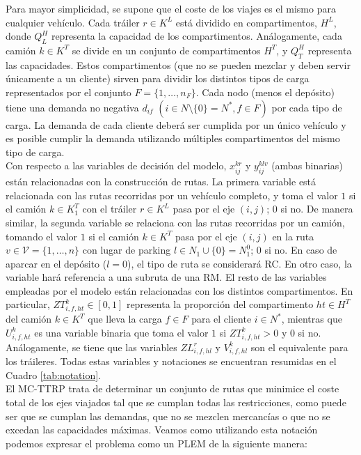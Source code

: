 Para mayor simplicidad, se supone que el coste de los viajes es el mismo para cualquier vehículo. Cada tráiler $r\in K^L$ está dividido en compartimentos, $H^L$, donde $Q_L^H$ representa la capacidad de los compartimentos. Análogamente, cada camión $k\in K^T$ se divide en un conjunto de compartimentos $H^T$, y $Q_T^H$ representa las capacidades. Estos compartimentos (que no se pueden mezclar y deben servir únicamente a un cliente) sirven para dividir los distintos tipos de carga representados por el conjunto $F=\{1,\ldots,n_F\}$. Cada nodo (menos el depósito) tiene una demanda no negativa $d_{if}$ $(i\in N\setminus\{0\}=N^*,f\in F)$ por cada tipo de carga. La demanda de cada cliente deberá ser cumplida por un único vehículo y es posible cumplir la demanda utilizando múltiples compartimentos del mismo tipo de carga.\\

Con respecto a las variables de decisión del modelo, $x_{ij}^{kr}$ y $y_{ij}^{klv}$ (ambas binarias) están relacionadas con la construcción de rutas. La primera variable está relacionada con las rutas recorridas por un vehículo completo, y toma el valor $1$ si el camión $k\in K^T_1$ con el tráiler $r\in K^L$ pasa por el eje $(i,j)$; 0 si no. De manera similar, la segunda variable se relaciona con las rutas recorridas por un camión, tomando el valor $1$ si el camión $k\in K^T$ pasa por el eje $(i,j)$ en la ruta $v\in\mathcal{V}=\{1,\ldots,n\}$ con lugar de parking $l\in N_1\cup\{0\}=N_1^0$; 0 si no. En caso de aparcar en el depósito ($l=0$), el tipo de ruta se considerará RC. En otro caso, la variable hará referencia a una subruta de una RM. El resto de las variables empleadas por el modelo están relacionadas con los distintos compartimentos. En particular, $ZT^k_{i,f,ht}\in[0,1]$ representa la proporción del compartimento $ht\in H^T$ del camión $k\in K^T$ que lleva la carga $f\in F$ para el cliente $i\in N^*$, mientras que $U_{i,f,ht}^k$ es una variable binaria que toma el valor $1$ si $ZT^k_{i,f,ht}>0$ y 0 si no. Análogamente, se tiene que las variables $ZL^r_{i,f,hl}$ y $V_{i,f,hl}^k$ son el equivalente para los tráileres. Todas estas variables y notaciones se encuentran resumidas en el Cuadro \ref{tab:notation}.\\

El MC-TTRP trata de determinar un conjunto de rutas que minimice el coste total de los ejes viajados tal que se cumplan todas las restricciones, como puede ser que se cumplan las demandas, que no se mezclen mercancías o que no se excedan las capacidades máximas. Veamos como utilizando esta notación podemos expresar el problema como un PLEM de la siguiente manera:

